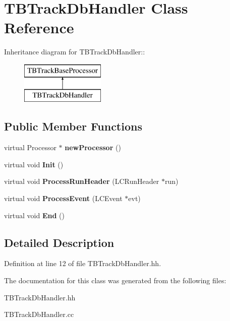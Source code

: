 \section{TBTrackDbHandler Class Reference}
\label{classTBTrackDbHandler}
Inheritance diagram for TBTrackDbHandler::\begin{figure}[H]
\begin{center}
\leavevmode
\includegraphics[height=2cm]{classTBTrackDbHandler}
\end{center}
\end{figure}
\subsection*{Public Member Functions}
\begin{DoxyCompactItemize}
\item 
virtual Processor $\ast$ {\bfseries newProcessor} ()\label{classTBTrackDbHandler_abe806895dc04980136469ac90bcc9982}

\item 
virtual void {\bfseries Init} ()\label{classTBTrackDbHandler_a57e8094c85725134aa69b7fbf7b7b8eb}

\item 
virtual void {\bfseries ProcessRunHeader} (LCRunHeader $\ast$run)\label{classTBTrackDbHandler_afc16f115885dc980dd75aaa41efceb81}

\item 
virtual void {\bfseries ProcessEvent} (LCEvent $\ast$evt)\label{classTBTrackDbHandler_aab729168e31d8f81a28800164444cadc}

\item 
virtual void {\bfseries End} ()\label{classTBTrackDbHandler_a2db2ea2c3d53cd585a21f5130def6732}

\end{DoxyCompactItemize}


\subsection{Detailed Description}


Definition at line 12 of file TBTrackDbHandler.hh.

The documentation for this class was generated from the following files:\begin{DoxyCompactItemize}
\item 
TBTrackDbHandler.hh\item 
TBTrackDbHandler.cc\end{DoxyCompactItemize}
